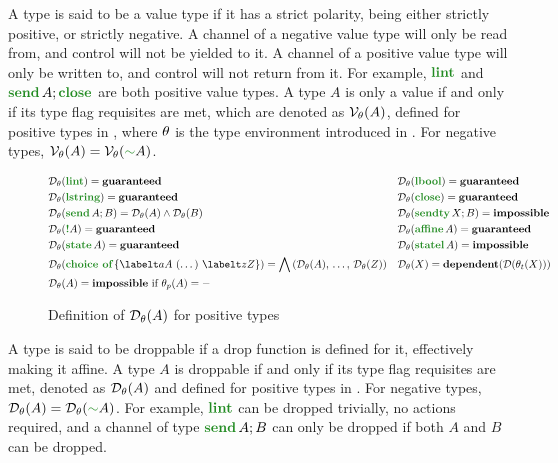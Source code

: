 A type is said to be a value type if it has a strict polarity, being either strictly positive, or strictly negative. A channel of a negative value type will only be read from, and control will not be yielded to it. A channel of a positive value type will only be written to, and control will not return from it. For example, $\lintt$ and $\sendt{A}{\closet}$ are both positive value types. A type $A$ is only a value if and only if its type flag requisites are met, which are denoted as $\mathcal{V}_\theta(A)$, defined for positive types in , where $\theta$ is the type environment introduced in . For negative types, $\isvalue{A} = \isvalue{\dualt A}$.

\begin{figure}[t]
    \centering
    \[\begin{aligned}
        &\isdroppable{\lintt} = \guaranteed && \isdroppable{\lboolt} = \guaranteed \\
        &\isdroppable{\lstringt} = \guaranteed && \isdroppable{\closet{}} = \guaranteed \\
        &\isdroppable{\sendt{A}{B}} = \isdroppable{A} \land \isdroppable{B} && \isdroppable{\sendtyt{X}{B}} = \impossible \\
        &\isdroppable{\bangt A} = \guaranteed && \isdroppable{\affinet A} = \guaranteed \\
        &\isdroppable{\statet A} = \guaranteed && \isdroppable{\statelt A} = \impossible \\
        &\isdroppable{\choicet{\labelt a A\ (\dots)\ \labelt z Z}} = \bigwedge\,(\isdroppable{A},\,\dots,\,\isdroppable{Z}) && \isdroppable{X} = \dependent{\depisdroppable{\typeidof{\typeenv}{X}}} \\
        &\isdroppable{A} = \impossible \text{ if } \polarityof{\typeenv}{A} = - \\
    \end{aligned}\]
    \vspace{-1em}
    \caption{Definition of $\mathcal{D}_\theta(A)$ for positive types}
    \label{fig:IsDroppableDefinition}
\end{figure}

A type is said to be droppable if a drop function is defined for it, effectively making it affine. A type $A$ is droppable if and only if its type flag requisites are met, denoted as $\mathcal{D}_\theta(A)$ and defined for positive types in . For negative types, $\isdroppable{A} = \isdroppable{\dualt A}$. For example, $\lintt$ can be dropped trivially, no actions required, and a channel of type $\sendt{A}{B}$ can only be dropped if both $A$ and $B$ can be dropped.

